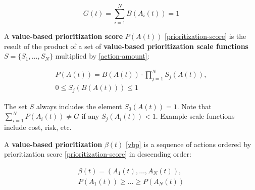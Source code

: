 \documentclass[12pt, a4paper, twocolumn]{article}
\begin{document}
\begin{equation}\label{goal-accomplished}
G(t) = \sum_{i=1}^{N} B(A_i(t)) = 1
\end{equation}

A \textbf{value-based prioritization score} $P(A(t))$ \eqref{prioritization-score} is the result of the product of a set of \textbf{value-based prioritization scale functions} $S = \{S_1, \ldots, S_N\}$ multiplied by \eqref{action-amount}:

\begin{equation}\label{prioritization-score}
  \begin{gathered}
P(A(t)) = B(A(t)) \cdot \prod_{j=1}^{N} S_j(A(t)), \\
0 \leq S_j(B(A(t))) \leq 1
  \end{gathered}
\end{equation}

The set $S$ always includes the element $S_0(A(t)) = 1$. Note that $\sum_{i=1}^{N} P(A_i(t)) \neq G$ if any $S_j(A_i(t)) < 1$. Example scale functions include cost, risk, etc.


A \textbf{value-based prioritization} $\beta(t)$ \eqref{vbp} is a sequence of actions ordered by prioritization score \eqref{prioritization-score} in descending order:

\begin{equation}\label{vbp}
  \begin{gathered}
\beta(t) = (A_1(t), \ldots, A_N(t)), \\
P(A_1(t)) \geq \ldots \geq P(A_N(t))
  \end{gathered}
\end{equation}
\end{document}
